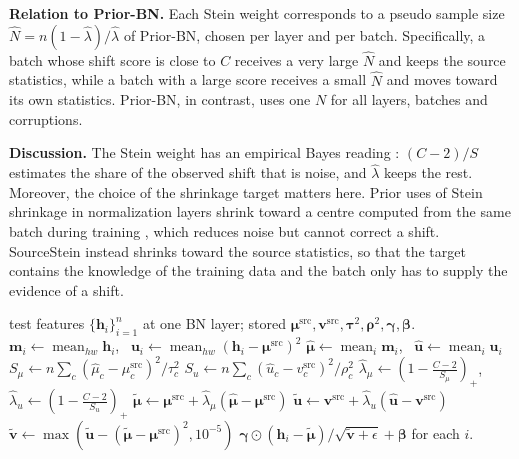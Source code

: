 \textbf{Relation to Prior-BN.} Each Stein weight corresponds to a pseudo sample size $\hat{N} = n(1-\hat{\lambda})/\hat{\lambda}$ of Prior-BN, chosen per layer and per batch.
Specifically, a batch whose shift score is close to $C$ receives a very large $\hat{N}$ and keeps the source statistics, while a batch with a large score receives a small $\hat{N}$ and moves toward its own statistics.
Prior-BN, in contrast, uses one $N$ for all layers, batches and corruptions.

\textbf{Discussion.} The Stein weight has an empirical Bayes reading \cite{Efron-Morris}: $(C-2)/S$ estimates the share of the observed shift that is noise, and $\hat{\lambda}$ keeps the rest.
Moreover, the choice of the shrinkage target matters here.
Prior uses of Stein shrinkage in normalization layers shrink toward a centre computed from the same batch during training \cite{JS-Norm, Stein-BN-Adv}, which reduces noise but cannot correct a shift.
SourceStein instead shrinks toward the source statistics, so that the target contains the knowledge of the training data and the batch only has to supply the evidence of a shift.

\begin{algorithm}[t]
  \captionsetup{labelformat=default,labelsep=colon,name=Algorithm}
  \caption{Normalization with SourceStein}
  \label{alg:sourcestein}
\begin{algorithmic}
   test features $\{\mathbf{h}_i\}_{i=1}^{n}$ at one BN layer; stored $\boldsymbol{\mu}^{\text{src}}, \mathbf{v}^{\text{src}}, \boldsymbol{\tau}^2, \boldsymbol{\rho}^2, \boldsymbol{\gamma}, \boldsymbol{\beta}$.
  \STATE {}
  \STATE $\mathbf{m}_i \leftarrow \operatorname{mean}_{hw}\mathbf{h}_i$, \ $\mathbf{u}_i \leftarrow \operatorname{mean}_{hw}(\mathbf{h}_i - \boldsymbol{\mu}^{\text{src}})^2$
  \STATE $\hat{\boldsymbol{\mu}} \leftarrow \operatorname{mean}_i \mathbf{m}_i$, \ $\hat{\mathbf{u}} \leftarrow \operatorname{mean}_i \mathbf{u}_i$
  \STATE {}
  \STATE $S_\mu \leftarrow n\sum_c (\hat{\mu}_c - \mu^{\text{src}}_c)^2/\tau^2_c$
  \STATE $S_u \leftarrow n\sum_c (\hat{u}_c - v^{\text{src}}_c)^2/\rho^2_c$
  \STATE $\hat{\lambda}_\mu \leftarrow (1 - \frac{C-2}{S_\mu})_+$, \ $\hat{\lambda}_u \leftarrow (1 - \frac{C-2}{S_u})_+$
  \STATE {}
  \STATE $\tilde{\boldsymbol{\mu}} \leftarrow \boldsymbol{\mu}^{\text{src}} + \hat{\lambda}_\mu(\hat{\boldsymbol{\mu}} - \boldsymbol{\mu}^{\text{src}})$
  \STATE $\tilde{\mathbf{u}} \leftarrow \mathbf{v}^{\text{src}} + \hat{\lambda}_u(\hat{\mathbf{u}} - \mathbf{v}^{\text{src}})$
  \STATE $\tilde{\mathbf{v}} \leftarrow \max(\tilde{\mathbf{u}} - (\tilde{\boldsymbol{\mu}} - \boldsymbol{\mu}^{\text{src}})^2, 10^{-5})$
   $\boldsymbol{\gamma} \odot (\mathbf{h}_i - \tilde{\boldsymbol{\mu}})/\sqrt{\tilde{\mathbf{v}} + \epsilon} + \boldsymbol{\beta}$ for each $i$.
\end{algorithmic}
\end{algorithm}

